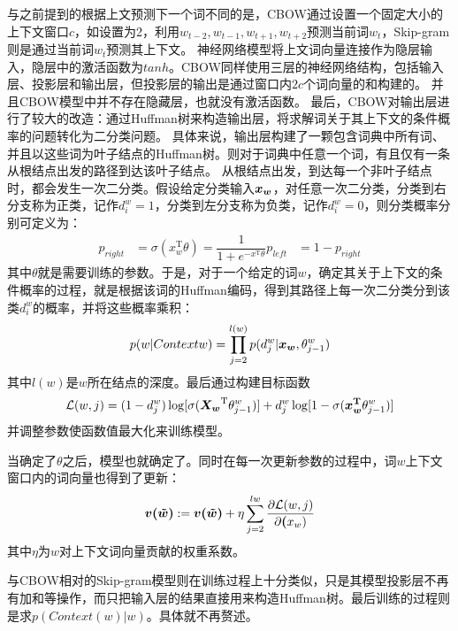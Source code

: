 与之前提到的根据上文预测下一个词不同的是，CBOW通过设置一个固定大小的上下文窗口$c$，如设置为2，利用$w_{t-2}, w_{t-1}, w_{t+1}, w_{t+2}$预测当前词$w_t$，Skip-gram则是通过当前词$w_t$预测其上下文。
神经网络模型将上文词向量连接作为隐层输入，隐层中的激活函数为$tanh$。CBOW同样使用三层的神经网络结构，包括输入层、投影层和输出层，但投影层的输出是通过窗口内$2c$个词向量的和构建的。
并且CBOW模型中并不存在隐藏层，也就没有激活函数。
最后，CBOW对输出层进行了较大的改造：通过Huffman树来构造输出层，将求解词关于其上下文的条件概率的问题转化为二分类问题。
具体来说，输出层构建了一颗包含词典中所有词、并且以这些词为叶子结点的Huffman树。则对于词典中任意一个词，有且仅有一条从根结点出发的路径到达该叶子结点。
从根结点出发，到达每一个非叶子结点时，都会发生一次二分类。假设给定分类输入$\boldsymbol{x_w}$，对任意一次二分类，分类到右分支称为正类，记作$d^w_i=1$，分类到左分支称为负类，记作$d^w_i=0$，则分类概率分别可定义为：
\begin{align}
    p_{right} &= \sigma(x_w^\mathrm{T}\theta) = \dfrac{1}{1+e^{-x^\mathrm{T}\theta}}
    p_{left} &= 1 - p_{right}
\end{align}
其中$\theta$就是需要训练的参数。于是，对于一个给定的词$w$，确定其关于上下文的条件概率的过程，就是根据该词的Huffman编码，得到其路径上每一次二分类分到该类$d^w_i$的概率，并将这些概率乘积：
\begin{equation}
    p(w|Context{w}) = \prod^{l(w)}_{j=2}p(d^w_j|\boldsymbol{x_w}, \theta^w_{j-1})
\end{equation}
其中$l(w)$是$w$所在结点的深度。最后通过构建目标函数
\begin{equation}
    \mathcal{L}(w,j) = (1-d^w_j)\log[\sigma(\boldsymbol{X_w}^\mathrm{T}\theta^w_{j-1})] + d^w_j\log[1-\sigma (\boldsymbol{x_w^\mathrm{T}}\theta^w_{j-1})]
\end{equation}
并调整参数使函数值最大化来训练模型。

当确定了$\theta$之后，模型也就确定了。同时在每一次更新参数的过程中，词$w$上下文窗口内的词向量也得到了更新：
\begin{equation}
    \boldsymbol{v(\tilde{w})} := \boldsymbol{v(\tilde{w})} + \eta\sum^{l{w}}_{j=2}\dfrac{\partial\mathcal{L}(w,j)}{\partial \boldsymbol{(}x_w)}
\end{equation}
其中$\eta$为$w$对上下文词向量贡献的权重系数。

与CBOW相对的Skip-gram模型则在训练过程上十分类似，只是其模型投影层不再有加和等操作，而只把输入层的结果直接用来构造Huffman树。最后训练的过程则是求$p(Context(w)|w)$。具体就不再赘述。

